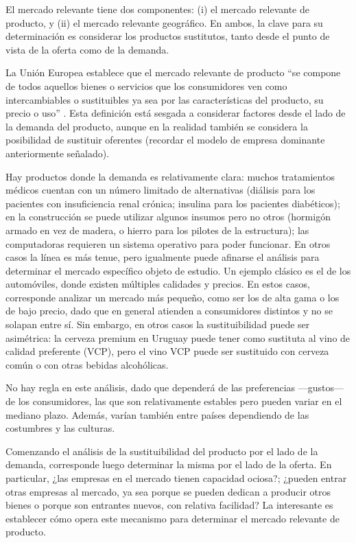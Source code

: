 \documentclass[
  12pt,
  spanish,
]{book}
\begin{document}
El mercado relevante tiene dos componentes: (i) el mercado relevante de
producto, y (ii) el mercado relevante geográfico. En ambos, la clave
para su determinación es considerar los productos sustitutos, tanto
desde el punto de vista de la oferta como de la demanda.

La Unión Europea establece que el mercado relevante de producto ``se
compone de todos aquellos bienes o servicios que los consumidores ven
como intercambiables o sustituibles ya sea por las características del
producto, su precio o uso'' \citep{UE1997}. Esta definición está sesgada
a considerar factores desde el lado de la demanda del producto, aunque
en la realidad también se considera la posibilidad de sustituir
oferentes (recordar el modelo de empresa dominante anteriormente
señalado).

Hay productos donde la demanda es relativamente clara: muchos
tratamientos médicos cuentan con un número limitado de alternativas
(diálisis para los pacientes con insuficiencia renal crónica; insulina
para los pacientes diabéticos); en la construcción se puede utilizar
algunos insumos pero no otros (hormigón armado en vez de madera, o
hierro para los pilotes de la estructura); las computadoras requieren un
sistema operativo para poder funcionar. En otros casos la línea es más
tenue, pero igualmente puede afinarse el análisis para determinar el
mercado específico objeto de estudio. Un ejemplo clásico es el de los
automóviles, donde existen múltiples calidades y precios. En estos
casos, corresponde analizar un mercado más pequeño, como ser los de alta
gama o los de bajo precio, dado que en general atienden a consumidores
distintos y no se solapan entre sí. Sin embargo, en otros casos la
sustituibilidad puede ser asimétrica: la cerveza premium en Uruguay
puede tener como sustituta al vino de calidad preferente (VCP), pero el
vino VCP puede ser sustituido con cerveza común o con otras bebidas
alcohólicas.

No hay regla en este análisis, dado que dependerá de las preferencias
---gustos--- de los consumidores, las que son relativamente estables
pero pueden variar en el mediano plazo. Además, varían también entre
países dependiendo de las costumbres y las culturas.

Comenzando el análisis de la sustituibilidad del producto por el lado de
la demanda, corresponde luego determinar la misma por el lado de la
oferta. En particular, ¿las empresas en el mercado tienen capacidad
ociosa?; ¿pueden entrar otras empresas al mercado, ya sea porque se
pueden dedican a producir otros bienes o porque son entrantes nuevos,
con relativa facilidad? La interesante es establecer cómo opera este
mecanismo para determinar el mercado relevante de producto.
\end{document}
